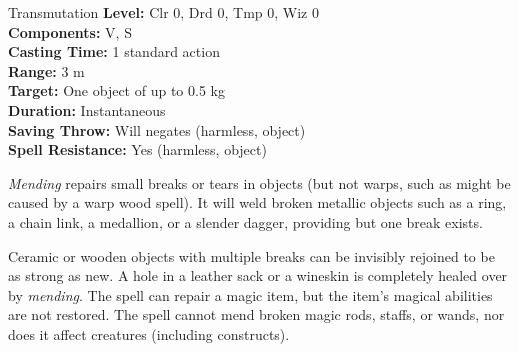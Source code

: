 {Transmutation}
{
	\textbf{Level:}
	Clr 0, Drd 0, Tmp 0, Wiz 0\\
	\textbf{Components:}
	V, S\\
	\textbf{Casting Time:}
	1 standard action\\
	\textbf{Range:}
	3 m\\
	\textbf{Target:}
	One object of up to 0.5 kg\\
	\textbf{Duration:}
	Instantaneous\\
	\textbf{Saving Throw:}
	Will negates (harmless, object)\\
	\textbf{Spell Resistance:}
	Yes (harmless, object)\\
}
{
	\emph{Mending} repairs small breaks or tears in objects (but not warps, such as might be caused by a warp wood spell). It will weld broken metallic objects such as a ring, a chain link, a medallion, or a slender dagger, providing but one break exists.

	Ceramic or wooden objects with multiple breaks can be invisibly rejoined to be as strong as new. A hole in a leather sack or a wineskin is completely healed over by \emph{mending}. The spell can repair a magic item, but the item's magical abilities are not restored. The spell cannot mend broken magic rods, staffs, or wands, nor does it affect creatures (including constructs).

}
